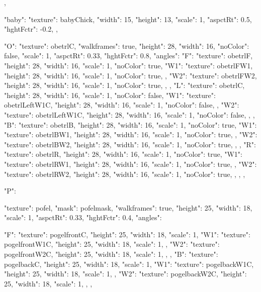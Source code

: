 {{{    }
  },

  "baby": {
    "texture": babyChick,
    "width": 15,
    "height": 13,
    "scale": 1,
    "aspctRt": 0.5,
    "hghtFctr": -0.2,
  },

  "O": {
    "texture": obetrlC,
    "walkframes": true,
    "height": 28,
    "width": 16,
    "noColor": false,
    "scale": 1,
    "aspctRt": 0.33,
    "hghtFctr": 0.8,
    "angles":{
      "F": {
        "texture": obetrlF,
        "height": 28,
        "width": 16,
        "scale": 1,
        "noColor": true,
        "W1": {
          "texture": obetrlFW1,
          "height": 28,
          "width": 16,
          "scale": 1,
          "noColor": true,
        },
        "W2": {
          "texture": obetrlFW2,
          "height": 28,
          "width": 16,
          "scale": 1,
          "noColor": true,
        },
      },
      "L": {
        "texture": obetrlC,
        "height": 28,
        "width": 16,
        "scale": 1,
        "noColor": false,
        "W1": {
          "texture": obetrlLeftW1C,
          "height": 28,
          "width": 16,
          "scale": 1,
          "noColor": false,
        },
        "W2": {
          "texture": obetrlLeftW1C,
          "height": 28,
          "width": 16,
          "scale": 1,
          "noColor": false,
        },
      },
      "B": {
        "texture": obetrlB,
        "height": 28,
        "width": 16,
        "scale": 1,
        "noColor": true,
        "W1": {
          "texture": obetrlBW1,
          "height": 28,
          "width": 16,
          "scale": 1,
          "noColor": true,
        },
        "W2": {
          "texture": obetrlBW2,
          "height": 28,
          "width": 16,
          "scale": 1,
          "noColor": true,
        },
      },
      "R": {
        "texture": obetrlR,
        "height": 28,
        "width": 16,
        "scale": 1,
        "noColor": true,
        "W1": {
          "texture": obetrlRW1,
          "height": 28,
          "width": 16,
          "scale": 1,
          "noColor": true,
        },
        "W2": {
          "texture": obetrlRW2,
          "height": 28,
          "width": 16,
          "scale": 1,
          "noColor": true,
        },
      },
    }
  },

  "P": {
    "texture": pofel,
    "mask": pofelmask,
    "walkframes": true,
    "height": 25,
    "width": 18,
    "scale": 1,
    "aspctRt": 0.33,
    "hghtFctr": 0.4,
    "angles":{
      "F": {
        "texture": pogelfrontC,
        "height": 25,
        "width": 18,
        "scale": 1,
        "W1": {
          "texture": pogelfrontW1C,
          "height": 25,
          "width": 18,
          "scale": 1,
        },
        "W2": {
          "texture": pogelfrontW2C,
          "height": 25,
          "width": 18,
          "scale": 1,
        },
      },
      "B": {
        "texture": pogelbackC,
        "height": 25,
        "width": 18,
        "scale": 1,
        "W1": {
          "texture": pogelbackW1C,
          "height": 25,
          "width": 18,
          "scale": 1,
        },
        "W2": {
          "texture": pogelbackW2C,
          "height": 25,
          "width": 18,
          "scale": 1,
        },
      },

}}}
